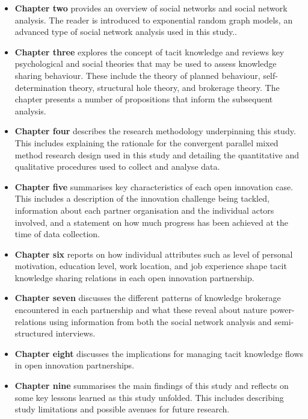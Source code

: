 \begin{itemize}[leftmargin=0pt]
  \item[] \textbf{Chapter two} provides an overview of social networks and social network analysis. The reader is introduced to exponential random graph models, an advanced type of social network analysis used in this study..
  
  \item[] \textbf{Chapter three} explores the concept of tacit knowledge and reviews key psychological and social theories that may be used to assess knowledge sharing behaviour. These include the theory of planned behaviour, self-determination theory, structural hole theory, and brokerage theory. The chapter presents a number of propositions that inform the subsequent analysis.
  
  \item[] \textbf{Chapter four} describes the research methodology underpinning this study. This includes explaining the rationale for the convergent parallel mixed method research design used in this study and detailing the quantitative and qualitative procedures used to collect and analyse data.
  
  \item[] \textbf{Chapter five} summarises key characteristics of each open innovation case. This includes a description of the innovation challenge being tackled, information about each partner organisation and the individual actors involved, and a statement on how much progress has been achieved at the time of data collection.
  
  \item[] \textbf{Chapter six} reports on how individual attributes such as level of personal motivation, education level, work location, and job experience shape tacit knowledge sharing relations in each open innovation partnership.
  
  \item[] \textbf{Chapter seven} discusses the different patterns of knowledge brokerage encountered in each partnership and what these reveal about nature power-relations using information from both the social network analysis and semi-structured interviews.
  
  \item[] \textbf{Chapter eight} discusses the implications for managing tacit knowledge flows in open innovation partnerships. 
  
  \item[] \textbf{Chapter nine} summarises the main findings of this study and reflects on some key lessons learned as this study unfolded. This includes describing study limitations and possible avenues for future research. 
\end{itemize}




